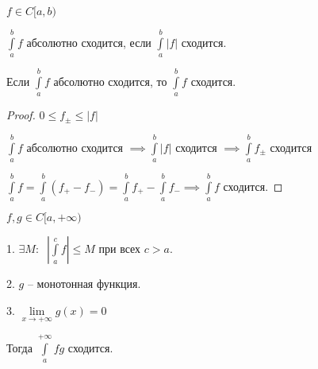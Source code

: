 
\begin{definition} \thmslashn
	
	$f \in C[a,b)$
	
	$\int\limits_a^b f$ абсолютно сходится, если $\int\limits_a^b |f|$ сходится.
	
\end{definition}

\begin{theorem} \thmslashn
	
	Если $\int\limits_a^b f$ абсолютно сходится, то $\int\limits_a^b f$ сходится.
	
\end{theorem} 

\begin{proof} \thmslashn
    
    $ 0 \le f_{\pm} \le |f|$
    
    $\int\limits_a^b f$ абсолютно сходится $\implies \int\limits_a^b |f|$ сходится $\implies \int\limits_a^b f_{\pm}$ сходится
    
    $\int\limits_a^b f = \int\limits_a^b (f_{+} - f_{-}) = \int\limits_a^b f_{+} - \int\limits_a^b f_{-} \implies \int\limits_a^b f$ сходится.
    
\end{proof}

\begin{theorem} \thmslashn
	
	$f, g \in C[a,+\infty)$
	
	1. $\exists M : \;\; |\int\limits_a^c f| \le M$ при всех $c > a$.
	
	2. $g$ -- монотонная функция.
	
	3. $\lim\limits_{x \to +\infty} g(x) = 0$
	
	Тогда $\int\limits_a^{+\infty} fg$ сходится.
\end{theorem}

